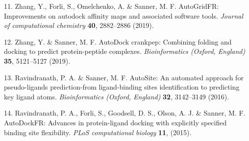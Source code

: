 \documentclass[
]{article}
\newenvironment{cslreferences}%
  {}%
  {\par}
\begin{document}
\begin{cslreferences}
\leavevmode\hypertarget{ref-AutogridfrImpZhang2019}{}%
11. Zhang, Y., Forli, S., Omelchenko, A. \& Sanner, M. F. AutoGridFR: Improvements on autodock affinity maps and associated software tools. \emph{Journal of computational chemistry} \textbf{40}, 2882--2886 (2019).

\leavevmode\hypertarget{ref-AutodockCrankpZhang2019}{}%
12. Zhang, Y. \& Sanner, M. F. AutoDock crankpep: Combining folding and docking to predict protein-peptide complexes. \emph{Bioinformatics (Oxford, England)} \textbf{35}, 5121--5127 (2019).

\leavevmode\hypertarget{ref-AutositeAnAuRavind2016}{}%
13. Ravindranath, P. A. \& Sanner, M. F. AutoSite: An automated approach for pseudo-ligands prediction-from ligand-binding sites identification to predicting key ligand atoms. \emph{Bioinformatics (Oxford, England)} \textbf{32}, 3142--3149 (2016).

\leavevmode\hypertarget{ref-AutodockfrAdvRavind2015}{}%
14. Ravindranath, P. A., Forli, S., Goodsell, D. S., Olson, A. J. \& Sanner, M. F. AutoDockFR: Advances in protein-ligand docking with explicitly specified binding site flexibility. \emph{PLoS computational biology} \textbf{11}, (2015).
\end{cslreferences}
\end{document}
